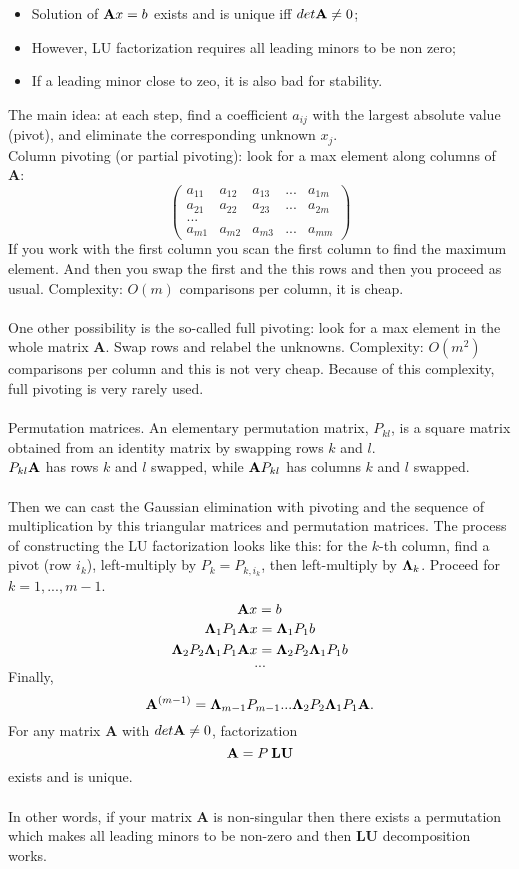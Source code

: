 \documentclass{article}
\begin{document}
\begin{itemize}
    \item Solution of ${\bf A}x=b$ exists and is unique iff $det{\bf A} \neq 0$;
    \item However, LU factorization requires all leading minors to be non zero;
    \item If a leading minor close to zeo, it is also bad for stability.
\end{itemize}
The main idea: at each step, find a coefficient $a_{ij}$ with the largest absolute value (pivot), and eliminate the corresponding unknown $x_j$.
\\Column pivoting (or partial pivoting): look for a max element along columns of {\bf A}:
\[
\begin{pmatrix}
    a_{11} & a_{12} & a_{13} & ... & a_{1m}\\
    a_{21} & a_{22} & a_{23} & ... & a_{2m}\\
    ...\\
    a_{m1} & a_{m2} & a_{m3} & ... & a_{mm}
\end{pmatrix}
\]
If you work with the first column you scan the first column to find the maximum element. And then you swap the first and the this rows and then you proceed as usual. Complexity: $O(m)$ comparisons per column, it is cheap.
\\\\One other possibility is the so-called full pivoting: look for a max element in the whole matrix {\bf A}. Swap rows and relabel the unknowns. Complexity: $O(m^2)$ comparisons per column and this is not very cheap. Because of this complexity, full pivoting is very rarely used.
\\\\Permutation matrices. An elementary permutation matrix, $P_{kl}$, is a square matrix obtained from an identity matrix by swapping rows $k$ and $l$.
\\$P_{kl}{\bf A}$ has rows $k$ and $l$ swapped, while ${\bf A}P_{kl}$ has columns $k$ and $l$ swapped.
\\\\Then we can cast the Gaussian elimination with pivoting and the sequence of multiplication by this triangular matrices and permutation matrices. The process of constructing the LU factorization looks like this: for the $k$-th column, find a pivot (row $i_k$), left-multiply by $P_k=P_{k,i_k}$, then left-multiply by ${\bf \Lambda}_k$. Proceed for $k = 1, ... , m-1$.
\[
{\bf A}x = b
\]
\[
{\bf \Lambda}_1P_1{\bf A}x = {\bf \Lambda}_1P_1b
\]
\[
{\bf \Lambda}_2P_2{\bf \Lambda}_1P_1{\bf A}x = {\bf \Lambda}_2P_2{\bf \Lambda}_1P_1b
\]
\[
...
\]
Finally,
\[
{\bf A}^{(m-1)} = {\bf \Lambda}_{m-1}P_{m-1}...{\bf \Lambda}_2P_2{\bf \Lambda}_1P_1{\bf A}.
\]
For any matrix {\bf A} with $det{\bf A} \neq 0$, factorization
\[
{\bf A} = P\: {\bf LU}
\]
exists and is unique.
\\\\In other words, if your matrix {\bf A} is non-singular then there exists a permutation which makes all leading minors to be non-zero and then {\bf LU} decomposition works.
\end{document}
